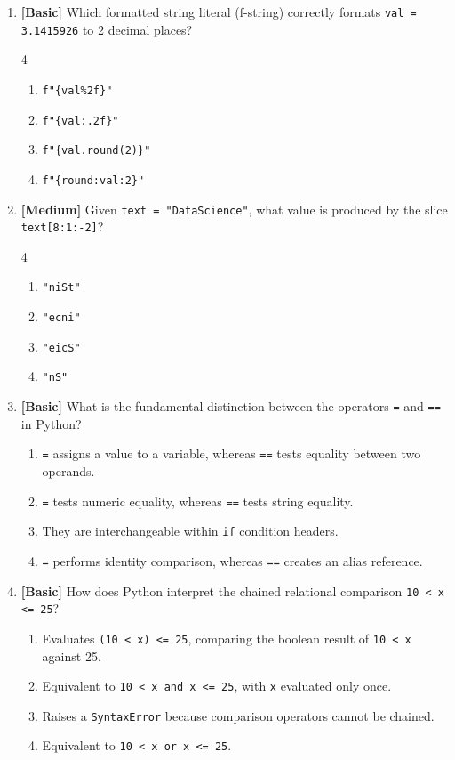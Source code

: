\documentclass[11pt,a4paper]{article}
\begin{document}
\begin{enumerate}[label=\textbf{Q\arabic*.},leftmargin=1.8em,itemsep=0.8pt,topsep=0.3pt,resume]
\item \textbf{[Basic]} Which formatted string literal (f-string) correctly formats \texttt{val = 3.1415926} to 2 decimal places?
\begin{multicols}{4}
\begin{enumerate}[label=\Alph*.]
  \item \texttt{f"\{val\%2f\}"}
  \item \texttt{f"\{val:.2f\}"}
  \item \texttt{f"\{val.round(2)\}"}
  \item \texttt{f"\{round:val:2\}"}
\end{enumerate}
\end{multicols}

\item \textbf{[Medium]} Given \texttt{text = "DataScience"}, what value is produced by the slice \texttt{text[8:1:-2]}?
\begin{multicols}{4}
\begin{enumerate}[label=\Alph*.]
  \item \texttt{"niSt"}
  \item \texttt{"ecni"}
  \item \texttt{"eicS"}
  \item \texttt{"nS"}
\end{enumerate}
\end{multicols}

\item \textbf{[Basic]} What is the fundamental distinction between the operators \texttt{=} and \texttt{==} in Python?
\begin{enumerate}[label=\Alph*.,leftmargin=1.8em]
  \item \texttt{=} assigns a value to a variable, whereas \texttt{==} tests equality between two operands.
  \item \texttt{=} tests numeric equality, whereas \texttt{==} tests string equality.
  \item They are interchangeable within \texttt{if} condition headers.
  \item \texttt{=} performs identity comparison, whereas \texttt{==} creates an alias reference.
\end{enumerate}

\item \textbf{[Basic]} How does Python interpret the chained relational comparison \texttt{10 < x <= 25}?
\begin{enumerate}[label=\Alph*.,leftmargin=1.8em]
  \item Evaluates \texttt{(10 < x) <= 25}, comparing the boolean result of \texttt{10 < x} against 25.
  \item Equivalent to \texttt{10 < x and x <= 25}, with \texttt{x} evaluated only once.
  \item Raises a \texttt{SyntaxError} because comparison operators cannot be chained.
  \item Equivalent to \texttt{10 < x or x <= 25}.
\end{enumerate}

\end{enumerate}
\end{document}
